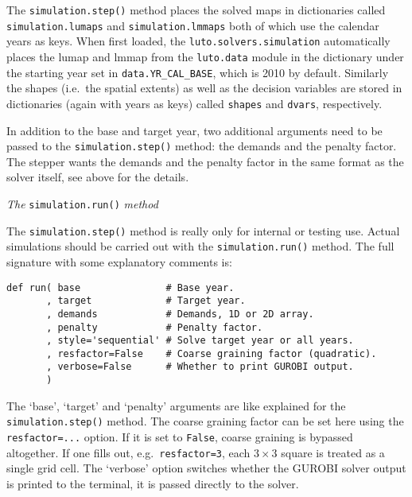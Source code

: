 \documentclass[12pt,a4paper,twoside]{article}
\begin{document}
The \texttt{simulation.step()} method places the solved maps in dictionaries called \texttt{simulation.lumaps} and \texttt{simulation.lmmaps} both of which use the calendar years as keys. When first loaded, the \texttt{luto.solvers.simulation} automatically places the lumap and lmmap from the \texttt{luto.data} module in the dictionary under the starting year set in \texttt{data.YR_CAL_BASE}, which is 2010 by default. Similarly the shapes (i.e.\ the spatial extents) as well as the decision variables are stored in dictionaries (again with years as keys) called \texttt{shapes} and \texttt{dvars}, respectively.

In addition to the base and target year, two additional arguments need to be passed to the \texttt{simulation.step()} method: the demands and the penalty factor. The stepper wants the demands and the penalty factor in the same format as the solver itself, see above for the details.

\emph{The} \texttt{simulation.run()} \emph{method}

The \texttt{simulation.step()} method is really only for internal or testing use. Actual simulations should be carried out with the \texttt{simulation.run()} method. The full signature with some explanatory comments is:

\begin{verbatim}
def run( base               # Base year.
       , target             # Target year.
       , demands            # Demands, 1D or 2D array.
       , penalty            # Penalty factor.
       , style='sequential' # Solve target year or all years.
       , resfactor=False    # Coarse graining factor (quadratic).
       , verbose=False      # Whether to print GUROBI output.
       )
\end{verbatim}

The `base', `target' and `penalty' arguments are like explained for the \texttt{simulation.step()} method. The coarse graining factor can be set here using the \texttt{resfactor=...} option. If it is set to \texttt{False}, coarse graining is bypassed altogether. If one fills out, e.g.\ \texttt{resfactor=3}, each $3 \times 3$ square is treated as a single grid cell. The `verbose' option switches whether the GUROBI solver output is printed to the terminal, it is passed directly to the solver.
\end{document}

